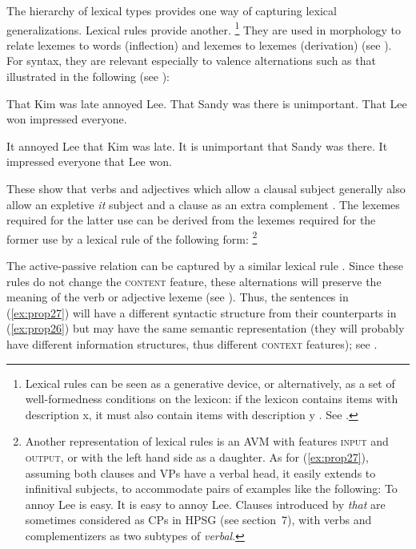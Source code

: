 \documentclass[output=paper
	        ,collection
	        ,collectionchapter
 	        ,biblatex
                ,babelshorthands
                ,newtxmath
                ,draftmode
                ,colorlinks, citecolor=brown
]{langscibook}
\begin{document}
The hierarchy of lexical types provides one way of capturing lexical generalizations. Lexical rules provide another.%
%
\footnote{Lexical rules can be seen as a generative device, or alternatively, as a set of well-formedness conditions on the lexicon: if the lexicon contains items with description x, it must also contain items with description y \citep{Meurers2001a}. See .}
%
They are used in morphology to relate lexemes to words (inflection) and lexemes to lexemes (derivation) (see ). For syntax, they are relevant especially to valence alternations such as that illustrated in the following (see ):

\ea\label{ex:prop26}
	\ea That Kim was late annoyed Lee.
	\ex That Sandy was there is unimportant. 
	\ex That Lee won impressed everyone.
	\z
	
\ex\label{ex:prop27}
	\ea It annoyed Lee that Kim was late.
	\ex It is unimportant that Sandy was there. 
	\ex It impressed everyone that Lee won.
	\z
\z

These show that verbs and adjectives which allow a clausal subject generally also allow an expletive \emph{it} subject and a clause as an extra complement \citep[150]{ps2}. The lexemes required for the latter use can be derived from the lexemes required for the former use by a lexical rule of the following form:%
%
\footnote{Another representation of lexical rules is an AVM with features \textsc{input} and \textsc{output}, or with the left hand side as a daughter. As for (\ref{ex:prop27}), assuming both clauses and VPs have a verbal head, it easily extends to infinitival subjects, to accommodate pairs of examples like the following:
	\ea To annoy Lee is easy.
	\ex It is easy to annoy Lee.
	\z
Clauses introduced by \emph{that} are sometimes considered as CPs in HPSG (see section~7), with verbs and complementizers as two subtypes of \emph{verbal}.
	
}
%

\ea\label{ex:prop28}
\avmtmp{[arg-st & <S> \+ \2] $\mapsto$
	[arg-st & <NP![\type{it}]!> \+ \2 \+ <S>]}
\z

The active-passive relation can be captured by a similar lexical rule \citep{Flickinger87}. Since these rules do not change the \textsc{content} feature, these alternations will preserve the meaning of the verb or adjective lexeme (see ). Thus, the sentences in (\ref{ex:prop27}) will have a different syntactic structure from their counterparts in (\ref{ex:prop26}) but may have the same semantic representation (they will probably have different information structures, thus different \textsc{context} features); see .
\end{document}
